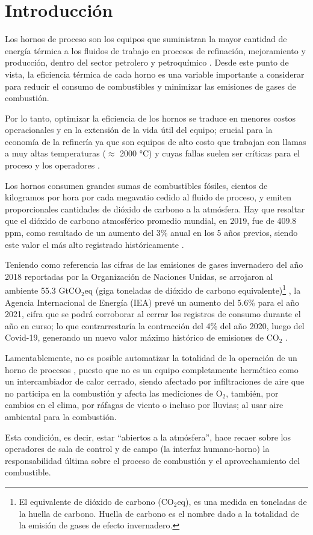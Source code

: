 \chapter*{Introducción}

\par Los hornos de proceso son los equipos que suministran la mayor cantidad de energía térmica a los fluidos de trabajo en procesos de refinación, mejoramiento y producción, dentro del sector petrolero y petroquímico \cite{bib:sandoval}. Desde este punto de vista, la eficiencia térmica de cada horno es una variable importante a considerar para reducir el consumo de combustibles y minimizar las emisiones de gases de combustión.

\par Por lo tanto, optimizar la eficiencia de los hornos se traduce en menores costos operacionales y en la extensión de la vida útil del equipo; crucial para la economía de la refinería ya que son equipos de alto costo que trabajan con llamas a muy altas temperaturas ($\approx$ 2000 °C) y cuyas fallas suelen ser críticas para el proceso y los operadores \cite{bib:economics}.

\par Los hornos consumen grandes sumas de combustibles fósiles, cientos de kilogramos por hora por cada megavatio cedido al fluido de proceso, y emiten proporcionales cantidades de dióxido de carbono a la atmósfera. Hay que resaltar que el dióxido de carbono atmosférico promedio mundial, en 2019, fue de 409.8 ppm, como resultado de un aumento del 3\% anual en los 5 años previos, siendo este valor el más alto registrado históricamente \cite{bib:clima}.
\par Teniendo como referencia las cifras de las emisiones de gases invernadero del año 2018 reportadas por la Organización de Naciones Unidas, se arrojaron al ambiente 55.3 GtCO$_2$eq (giga toneladas de dióxido de carbono equivalente)\footnote{El equivalente de dióxido de carbono (CO$_2$eq), es una medida en toneladas de la huella de carbono. Huella de carbono es el nombre dado a la totalidad de la emisión de gases de efecto invernadero.} \cite{onu}, la Agencia Internacional de Energía (IEA) prevé un aumento del 5.6\% para el año 2021, cifra que se podrá corroborar al cerrar los registros de consumo durante el año en curso; lo que contrarrestaría la contracción del 4\% del año 2020, luego del Covid-19, generando un nuevo valor máximo histórico de emisiones de CO$_2$ \cite{bib:iea}.

\par Lamentablemente, no es posible automatizar la totalidad de la operación de un horno de procesos \cite{bib:instrumentacion}, puesto que no es un equipo completamente hermético como un intercambiador de calor cerrado, siendo afectado por infiltraciones de aire que no participa en la combustión y afecta las mediciones de O$_2$, también, por cambios en el clima, por ráfagas de viento o incluso por lluvias; al usar aire ambiental para la combustión.
\par Esta condición, es decir, estar ``abiertos a la atmósfera'', hace recaer sobre los operadores de sala de control y de campo (la interfaz humano-horno) la responsabilidad última sobre el proceso de combustión y el aprovechamiento del combustible.

